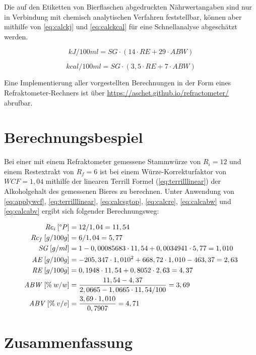 \documentclass[a4paper,parskip=half]{scrartcl}
\newcommand{\bxi}{\mathit{R}_i}
\newcommand{\bxic}{\mathit{Rc}_i}
\newcommand{\bxf}{\mathit{R}_f}
\newcommand{\bxfc}{\mathit{Rc}_f}
\newcommand{\sg}{\mathit{SG}}
\newcommand{\abv}{\mathit{ABV}}
\newcommand{\abw}{\mathit{ABW}}
\newcommand{\aex}{\mathit{AE}}
\newcommand{\rex}{\mathit{RE}}
\newcommand{\wcf}{\mathit{WCF}}
\begin{document}
Die auf den Etiketten von Bierflaschen abgedruckten Nährwertangaben sind
nur in Verbindung mit chemisch analytischen Verfahren feststellbar,
können aber mithilfe von \autoref{eq:calckj} und \autoref{eq:calckcal}
für eine Schnellanalyse abgeschätzt werden. \autocite{MEBAK2013} 

\begin{equation}
kJ/100ml = \sg \cdot (14 \cdot \rex + 29 \cdot \abw)
\label{eq:calckj}
\end{equation}

\begin{equation}
kcal/100ml = \sg \cdot (3,5 \cdot \rex + 7 \cdot \abw)
\label{eq:calckcal}
\end{equation}

Eine Implementierung aller vorgestellten Berechnungen in der Form eines
Refraktometer-Rechners ist über \url{https://aschet.github.io/refractometer/}
abrufbar.

\section*{Berechnungsbespiel}

Bei einer mit einem Refraktometer gemessene Stammwürze von $\bxi = 12$
und einem Restextrakt von $\bxf = 6$ ist bei einem Würze-Korrekturfaktor
von $\wcf = 1,04$ mithilfe der linearen Terrill Formel
(\autoref{eq:terrilllinear}) der Alkoholgehalt des gemessenen Bieres
zu berechnen. Unter Anwendung von \autoref{eq:applywcf},
\autoref{eq:terrilllinear}, \autoref{eq:calcsgtop},
\autoref{eq:calcre}, \autoref{eq:calcabw} und \autoref{eq:calcabv} ergibt
sich folgender Berechnungsweg:

\begin{align*}
\bxic\:[\degree P] &= 12 / 1,04 = 11,54 \\
\bxfc\:[g/100g] &= 6 / 1,04 = 5,77 \\
\sg\:[g/ml] &= 1 - 0,00085683 \cdot 11,54 + 0,0034941 \cdot 5,77 = 1,010 \\
\aex\:[g/100g] &= -205,347 \cdot 1,010^2 + 668,72 \cdot 1,010 - 463,37 = 2,63 \\
\rex\:[g/100g] &= 0,1948 \cdot 11,54 + 0,8052 \cdot 2,63 = 4,37 \\
\abw\:[\%\:w/w] &= \frac{11,54 - 4,37}{2,0665 - 1,0665 \cdot 11,54 / 100} = 3,69 \\
\abv\:[\%\:v/v] &= \frac{3,69 \cdot 1,010}{0,7907} = 4,71
\end{align*}

\section*{Zusammenfassung}
\end{document}
